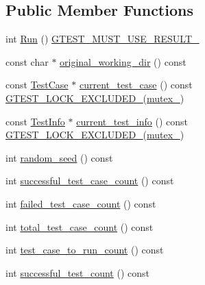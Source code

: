 \subsection*{Public Member Functions}
\begin{DoxyCompactItemize}
\item 
int \hyperlink{classtesting_1_1UnitTest_a2febc800536b44500565f4c423f359d3}{Run} () \hyperlink{gtest-port_8h_a8e5aab8276b2645f64f41c9e3021b935}{G\+T\+E\+S\+T\+\_\+\+M\+U\+S\+T\+\_\+\+U\+S\+E\+\_\+\+R\+E\+S\+U\+L\+T\+\_\+}
\item 
const char $\ast$ \hyperlink{classtesting_1_1UnitTest_af6809b7747785c80f7a2f31f6b39b152}{original\+\_\+working\+\_\+dir} () const
\item 
const \hyperlink{classtesting_1_1TestCase}{Test\+Case} $\ast$ \hyperlink{classtesting_1_1UnitTest_a2bf61896036ae03edbd7bceed14f9e18}{current\+\_\+test\+\_\+case} () const \hyperlink{gtest-port_8h_a69abff5a4efdd07bd5faebe3dd318d06}{G\+T\+E\+S\+T\+\_\+\+L\+O\+C\+K\+\_\+\+E\+X\+C\+L\+U\+D\+E\+D\+\_\+}(\hyperlink{classtesting_1_1UnitTest_abb94ef45cf0ab43be81ac6d5b1364132}{mutex\+\_\+})
\item 
const \hyperlink{classtesting_1_1TestInfo}{Test\+Info} $\ast$ \hyperlink{classtesting_1_1UnitTest_a088eaf814a33085ace3d881d22e6bdea}{current\+\_\+test\+\_\+info} () const \hyperlink{gtest-port_8h_a69abff5a4efdd07bd5faebe3dd318d06}{G\+T\+E\+S\+T\+\_\+\+L\+O\+C\+K\+\_\+\+E\+X\+C\+L\+U\+D\+E\+D\+\_\+}(\hyperlink{classtesting_1_1UnitTest_abb94ef45cf0ab43be81ac6d5b1364132}{mutex\+\_\+})
\item 
int \hyperlink{classtesting_1_1UnitTest_adddc090a06f2d3a0e68f3762ee262688}{random\+\_\+seed} () const
\item 
int \hyperlink{classtesting_1_1UnitTest_acaa2ab71f53c25ffe0242a91c14e173f}{successful\+\_\+test\+\_\+case\+\_\+count} () const
\item 
int \hyperlink{classtesting_1_1UnitTest_abc0fa297a4103f7cdd9627ae27d9d0ef}{failed\+\_\+test\+\_\+case\+\_\+count} () const
\item 
int \hyperlink{classtesting_1_1UnitTest_a93fc8f4eebc3212d06468ad216830ced}{total\+\_\+test\+\_\+case\+\_\+count} () const
\item 
int \hyperlink{classtesting_1_1UnitTest_a965248fbe72f9fede5de921b6666943b}{test\+\_\+case\+\_\+to\+\_\+run\+\_\+count} () const
\item 
int \hyperlink{classtesting_1_1UnitTest_a49ee8056e357ad497e67399447dd5a40}{successful\+\_\+test\+\_\+count} () const
\item 

\end{DoxyCompactItemize}
